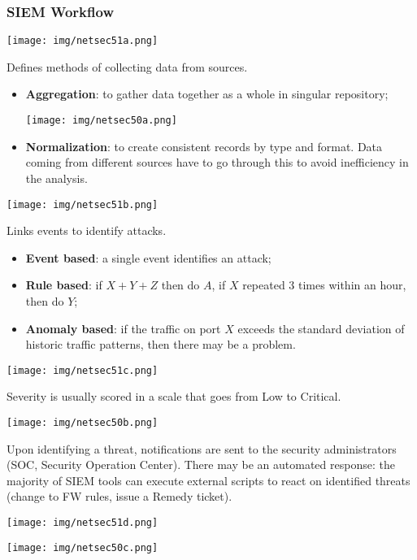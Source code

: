 \documentclass[a4paper, 10pt, titlepage]{article}
\begin{document}
\subsubsection*{SIEM Workflow}
\begin{center}
	\texttt{[image: img/netsec51a.png]}
\end{center}
Defines methods of collecting data from sources.
\begin{itemize}
	\item \textbf{Aggregation}: to gather data together as a whole in singular repository;
	\begin{center}
		\texttt{[image: img/netsec50a.png]}
	\end{center}
	\item \textbf{Normalization}: to create consistent records by type and format. Data coming from different sources have to go through this to avoid inefficiency in the analysis. 
\end{itemize}

\begin{center}
	\texttt{[image: img/netsec51b.png]}
\end{center}
Links events to identify attacks. 
\begin{itemize}
	\item \textbf{Event based}: a single event identifies an attack;
	\item \textbf{Rule based}: if $X + Y + Z$ then do $A$, if $X$ repeated 3 times within an hour, then do $Y$;
	\item \textbf{Anomaly based}: if the traffic on port $X$ exceeds the standard deviation of historic traffic patterns, then there may be a problem.
\end{itemize}

\begin{center}
	\texttt{[image: img/netsec51c.png]}
\end{center}
Severity is usually scored in a scale that goes from Low to Critical.
\begin{center}
	\texttt{[image: img/netsec50b.png]}
\end{center}
Upon identifying a threat, notifications are sent to the security administrators (SOC, Security Operation Center). There may be an automated response: the majority of SIEM tools can execute external scripts to react on identified threats (change to FW rules, issue a Remedy ticket).

\begin{center}
	\texttt{[image: img/netsec51d.png]}
\end{center}
\begin{center}
	\texttt{[image: img/netsec50c.png]}
\end{center}
\end{document}
